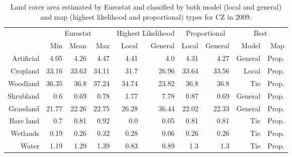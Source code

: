 \begin{table}[H]
\centering
\caption{Land cover area estimated by Eurostat and classified by both model (local and general) and map (highest likelihood and proportional) types for CZ in 2009.}

\begin{tabular}{r|rrr|rr|rr|rr}
\toprule
{} & \multicolumn{3}{|c}{Eurostat} & \multicolumn{2}{|c}{Highest Likelihood} & \multicolumn{2}{|c}{Proportional} & \multicolumn{2}{|c}{Best} \\
{} &      Min &   Mean &    Max &              Local & General &        Local & General &    Model &    Map \\
\midrule
Artificial &     4.05 &   4.26 &   4.47 &               4.41 &     4.0 &         4.31 &    4.27 &  General &  Prop. \\
Cropland   &    33.16 &  33.63 &  34.11 &               31.7 &   26.96 &        33.64 &   33.56 &    Local &  Prop. \\
Woodland   &    36.35 &   36.8 &  37.24 &              34.74 &   23.82 &         36.8 &    36.8 &      Tie &  Prop. \\
Shrubland  &      0.6 &   0.69 &   0.78 &               1.77 &    7.78 &         0.87 &    0.69 &  General &  Prop. \\
Grassland  &    21.77 &  22.26 &  22.75 &              26.28 &   36.44 &        22.02 &   22.33 &  General &  Prop. \\
Bare land  &      0.7 &   0.81 &   0.92 &                0.0 &    0.05 &         0.81 &    0.81 &      Tie &  Prop. \\
Wetlands   &     0.19 &   0.26 &   0.32 &               0.28 &    0.06 &         0.26 &    0.26 &      Tie &  Prop. \\
Water      &     1.19 &   1.29 &   1.39 &               0.83 &    0.89 &          1.3 &     1.3 &      Tie &  Prop. \\
\bottomrule
\end{tabular}
\end{table}

